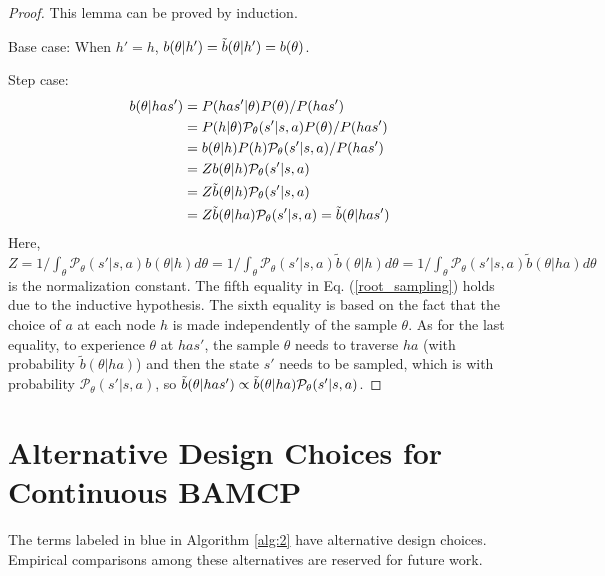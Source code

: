 \begin{proof}
This lemma can be proved by induction.

Base case: When $h'=h$, $b(\theta|h') = \Tilde{b}(\theta|h') = b(\theta)$.

Step case: 
\begin{equation} \label{root_sampling}
    \begin{aligned}
        b(\theta|has') & = P(has'|\theta) P(\theta) / P(has') \\
        & = P(h|\theta) \mathcal{P}_\theta(s'|s, a) P(\theta) / P(has') \\
        & = b(\theta|h)P(h) \mathcal{P}_\theta(s'|s, a) / P(has') \\
        & = Z b(\theta|h)\mathcal{P}_\theta(s'|s, a) \\
        & = Z \Tilde{b}(\theta|h) \mathcal{P}_\theta(s'|s, a) \\
        & = Z \Tilde{b}(\theta|ha) \mathcal{P}_\theta(s'|s, a) = \Tilde{b}(\theta|has')
    \end{aligned}
\end{equation}
Here, $Z = 1/\int_\theta \mathcal{P}_\theta(s'|s, a) b(\theta|h) d\theta = 1/\int_\theta \mathcal{P}_\theta(s'|s, a) \tilde{b}(\theta|h) d\theta = 1/\int_\theta \mathcal{P}_\theta(s'|s, a) \tilde{b}(\theta|ha) d\theta$ is the normalization constant. The fifth equality in Eq. (\ref{root_sampling}) holds due to the inductive hypothesis. The sixth equality is based on the fact that the choice of $a$ at each node $h$ is made independently of the sample $\theta$. As for the last equality, to experience $\theta$ at $has'$, the sample $\theta$ needs to traverse $ha$ (with probability $\tilde{b}(\theta|ha)$) and then the state $s'$ needs to be sampled, which is with probability $\mathcal{P}_\theta(s'|s, a)$, so $\Tilde{b}(\theta|has') \propto \tilde{b}(\theta|ha) \mathcal{P}_\theta(s'|s, a)$.
\end{proof}

\section{Alternative Design Choices for Continuous BAMCP} \label{alg1_details}

The terms labeled in blue in Algorithm \ref{alg:2} have alternative design choices. Empirical comparisons among these alternatives are reserved for future work.


